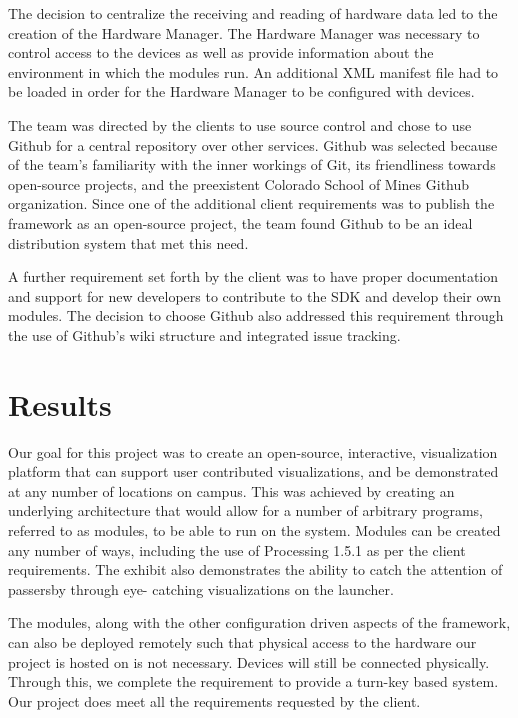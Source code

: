 \documentclass[11pt,letterpaper]{article}
\begin{document}
	The decision to centralize the receiving and reading of hardware data led to
	the creation of the Hardware Manager. The Hardware Manager was necessary to
	control access to the devices as well as provide information about the
	environment in which the modules run. An additional XML manifest file had to
	be loaded in order for the Hardware Manager to be configured with devices.

	The team was directed by the clients to use source control and chose to use
	Github for a central repository over other services. Github was selected
	because of the team's familiarity with the inner workings of Git, its
	friendliness towards open-source projects, and the preexistent Colorado School
	of Mines Github organization. Since one of the additional client requirements
	was to publish the framework as an open-source project, the team found Github
	to be an ideal distribution system that met this need.

	A further requirement set forth by the client was to have proper documentation
	and support for new developers to contribute to the SDK and develop their own
	modules. The decision to choose Github also addressed this requirement through
	the use of Github's wiki structure and integrated issue tracking.

	\pagebreak
   
	\section{Results}
	Our goal for this project was to create an open-source, interactive,
	visualization platform that can support user contributed visualizations, and be 
	demonstrated at any number of locations on campus. This was achieved by 
	creating an underlying architecture that would allow for a number of 
	arbitrary programs, referred to as modules, to be able to run on the system. 
	Modules can be created any number of ways, including the use of 
	Processing 1.5.1 as per the client requirements. The exhibit also 
	demonstrates the ability to catch the attention of passersby through eye-
	catching visualizations on the launcher.

	The modules, along with the other configuration driven aspects of the 
	framework, can also be deployed remotely such that physical access to the 
	hardware our project is hosted on is not necessary. Devices will still be 
	connected physically. Through this, we complete the requirement to provide 
	a turn-key based system. Our project does meet all the requirements 
	requested by the client. 
\end{document}

